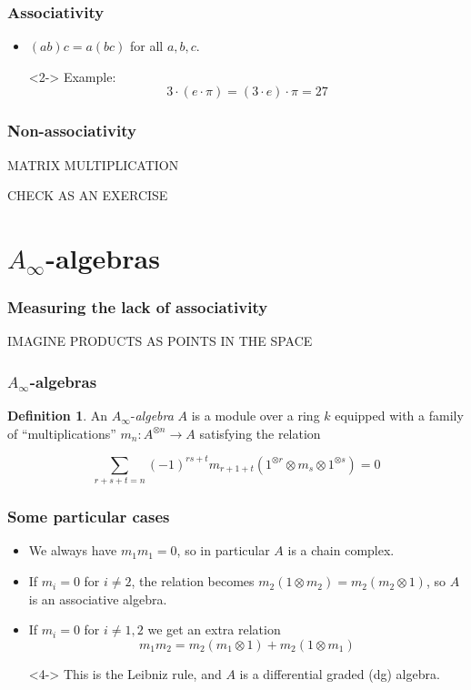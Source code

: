 \documentclass{beamer}
\theoremstyle{definition}
\newtheorem{defi}{Definition}
\begin{document}
\begin{frame}
\frametitle{Associativity}
\begin{itemize}
\item $(ab)c=a(bc)$ for all $a,b,c$.
\item[]<2-> Example: \[3\cdot (e\cdot \pi) = (3\cdot e)\cdot \pi = 27\]
\end{itemize}
\end{frame}

\begin{frame}
\frametitle{Non-associativity}
MATRIX MULTIPLICATION

CHECK AS AN EXERCISE
\end{frame}


\section{$A_\infty$-algebras}
\begin{frame}
\frametitle{Measuring the lack of associativity}

IMAGINE PRODUCTS AS POINTS IN THE SPACE
\end{frame}


\begin{frame}
\frametitle{$A_\infty$-algebras}
\begin{defi}
An $A_\infty$-\emph{algebra} $A$ is a module over a ring $k$ equipped with a family of ``multiplications'' $m_n:A^{\otimes n}\to A$ satisfying the relation

$$\sum_{r+s+t=n}(-1)^{rs+t}m_{r+1+t}(1^{\otimes r}\otimes m_s\otimes 1^{\otimes s})=0$$ %
\end{defi}
\end{frame}





\begin{frame}
\frametitle{Some particular cases}
\begin{itemize}
\item<1-> We always have $m_1m_1=0$, so in particular $A$ is a chain complex.%
\item<2-> If $m_i=0$ for $i\neq 2$, the relation becomes $m_2(1\otimes m_2)=m_2(m_2\otimes 1)$, so $A$ is an associative algebra.
\item<3-> If $m_i=0$ for $i\neq 1,2$ we get an extra relation $$m_1m_2=m_2(m_1\otimes 1)+m_2(1\otimes m_1)$$ %
\item[]<4-> This is the Leibniz rule, and $A$ is a differential graded (dg) algebra.
\end{itemize}
\end{frame}
\end{document}
